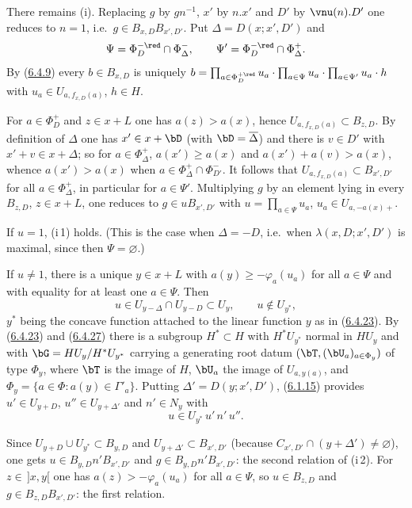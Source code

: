 \documentclass[12pt,a4paper,oneside,english]{smfart}
\newcommand{\btref}[1]{\hyperlink{bt:#1}{#1}}
\theoremstyle{definition}
\theoremstyle{bt}
\begin{document}
There remains (i). Replacing $g$ by $gn^{-1}$, $x'$ by $n.x'$ and $D'$ by
$\vnu(n).D'$ one reduces to $n=1$, i.e.\ $g\in B_{x,D}B_{x',D'}$. Put
$\Delta=D(x;x',D')$ and
\[
  \Psi=\Phi_D^{-\red}\cap\Phi_\Delta^{-},\qquad
  \Psi'=\Phi_D^{-\red}\cap\Phi_\Delta^{+}.
\]
By (\btref{6.4.9}) every $b\in B_{x,D}$ is uniquely
$b=\prod_{a\in\Phi_D^{+\red}}u_a\cdot\prod_{a\in\Psi}u_a\cdot
   \prod_{a\in\Psi'}u_a\cdot h$
with $u_a\in U_{a,f_{x,D}(a)}$, $h\in H$.

For $a\in\Phi_D^{+}$ and $z\in x+L$ one has $a(z)>a(x)$, hence
$U_{a,f_{x,D}(a)}\subset B_{z,D}$. By definition of $\Delta$ one has
$x'\in x+\bD$ (with $\bD=\overline{\Delta}$) and there is $v\in D'$ with
$x'+v\in x+\Delta$; so for $a\in\Phi_\Delta^{+}$, $a(x')\geqslant a(x)$ and
$a(x')+a(v)>a(x)$, whence $a(x')>a(x)$ when
$a\in\Phi_\Delta^{+}\cap\Phi_{D'}^{-}$. It follows that
$U_{a,f_{x,D}(a)}\subset B_{x',D'}$ for all $a\in\Phi_\Delta^{+}$, in particular for
$a\in\Psi'$. Multiplying $g$ by an element lying in every $B_{z,D}$, $z\in x+L$, one
reduces to $g\in uB_{x',D'}$ with $u=\prod_{a\in\Psi}u_a$, $u_a\in U_{a,-a(x)+}$.

If $u=1$, (i\,1) holds. (This is the case when $\Delta=-D$, i.e.\ when
$\lambda(x,D;x',D')$ is maximal, since then $\Psi=\varnothing$.)

If $u\neq1$, there is a unique $y\in x+L$ with $a(y)\geqslant-\varphi_a(u_a)$ for
all $a\in\Psi$ and with equality for at least one $a\in\Psi$. Then
\begin{equation}
  u\in U_{y-\Delta}\cap U_{y-D}\subset U_y,\qquad u\notin U_{y^{*}}, \tag{1}
\end{equation}
$y^{*}$ being the concave function attached to the linear function $y$ as in
(\btref{6.4.23}). By (\btref{6.4.23}) and (\btref{6.4.27}) there is a subgroup $H^{*}\subset H$ with
$H^{*}U_{y^{*}}$ normal in $HU_y$ and with
$\bG=HU_y/H^{*}U_{y^{*}}$ carrying a generating root datum
$(\bT,(\bU_a)_{a\in\Phi_y})$ of type $\Phi_y$, where $\bT$ is the image of $H$,
$\bU_a$ the image of $U_{a,y(a)}$, and $\Phi_y=\{a\in\Phi: a(y)\in\Gamma'_a\}$.
Putting $\Delta'=D(y;x',D')$, (\btref{6.1.15}) provides $u'\in U_{y+D}$,
$u''\in U_{y+\Delta'}$ and $n'\in N_y$ with
\begin{equation}
  u\in U_{y^{*}}\,u'\,n'\,u''. \tag{2}
\end{equation}

Since $U_{y+D}\cup U_{y^{*}}\subset B_{y,D}$ and
$U_{y+\Delta'}\subset B_{x',D'}$ (because $C_{x',D'}\cap(y+\Delta')\neq\varnothing$),
one gets $u\in B_{y,D}n'B_{x',D'}$ and $g\in B_{y,D}n'B_{x',D'}$: the second
relation of (i\,2). For $z\in\,]x,y[$ one has $a(z)>-\varphi_a(u_a)$ for all
$a\in\Psi$, so $u\in B_{z,D}$ and $g\in B_{z,D}B_{x',D'}$: the first relation.
\end{document}
